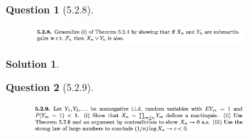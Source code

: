 \documentclass[11pt]{article}
\theoremstyle{plain}
\theoremstyle{quest}
\newtheorem*{question}{Question}
\newtheorem*{solution}{Solution}
\begin{document}
\newpage

\begin{question}[5.2.8]
\hfill
\begin{figure}[h!]
  \centering
    \includegraphics[width=0.7\textwidth]{d-5-2-8.png}
\end{figure}
\end{question}
\begin{solution} \hfill \\
\end{solution}

\newpage

\begin{question}[5.2.9]
\hfill
\begin{figure}[h!]
  \centering
    \includegraphics[width=0.7\textwidth]{d-5-2-9.png}
\end{figure}
\end{question}
\end{document}
